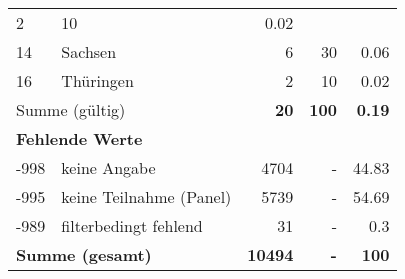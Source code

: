\begin{longtable}{lXrrr}
       \num{2} &
       \num[round-mode=places,round-precision=2]{10} &
         \num[round-mode=places,round-precision=2]{0.02} \\

     14 &
     \multicolumn{1}{X}{ Sachsen   } &


       \num{6} &
       \num[round-mode=places,round-precision=2]{30} &
         \num[round-mode=places,round-precision=2]{0.06} \\

     16 &
     \multicolumn{1}{X}{ Thüringen   } &


       \num{2} &
       \num[round-mode=places,round-precision=2]{10} &
         \num[round-mode=places,round-precision=2]{0.02} \\
     \midrule
     \multicolumn{2}{l}{Summe (gültig)} &
       \textbf{\num{20}} &
     \textbf{\num{100}} &
       \textbf{\num[round-mode=places,round-precision=2]{0.19}} \\
     \multicolumn{5}{l}{\textbf{Fehlende Werte}}\\
       -998 &
       keine Angabe &
         \num{4704} &
        - &
         \num[round-mode=places,round-precision=2]{44.83} \\
       -995 &
       keine Teilnahme (Panel) &
         \num{5739} &
        - &
         \num[round-mode=places,round-precision=2]{54.69} \\
       -989 &
       filterbedingt fehlend &
         \num{31} &
        - &
         \num[round-mode=places,round-precision=2]{0.3} \\
     \midrule
     \multicolumn{2}{l}{\textbf{Summe (gesamt)}} &
          \textbf{\num{10494}} &
        \textbf{-} &
        \textbf{\num{100}} \\
     \bottomrule
     \end{longtable}
     
